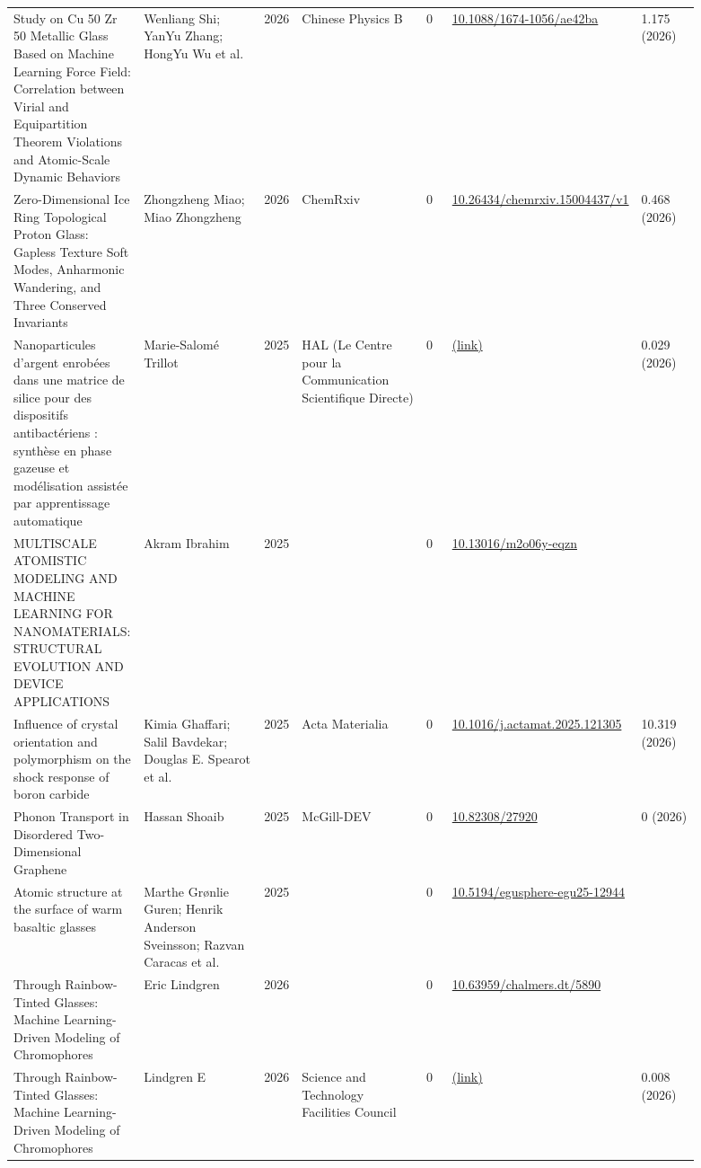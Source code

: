\documentclass[10pt,a4paper]{article}
\begin{document}
{\begin{longtable}{p{0.192\linewidth}p{0.192\linewidth}p{0.043\linewidth}p{0.192\linewidth}p{0.043\linewidth}p{0.132\linewidth}p{0.096\linewidth}}
Study on Cu 50 Zr 50 Metallic Glass Based on Machine Learning Force Field: Correlation between Virial and Equipartition Theorem Violations and Atomic-Scale Dynamic Behaviors & Wenliang Shi; YanYu Zhang; HongYu Wu et al. & 2026 & Chinese Physics B & 0 & \href{https://doi.org/10.1088/1674-1056/ae42ba}{10.1088/1674-1056/ae42ba} & 1.175 (2026) \\
Zero-Dimensional Ice Ring Topological Proton Glass: Gapless Texture Soft Modes, Anharmonic Wandering, and Three Conserved Invariants & Zhongzheng Miao; Miao Zhongzheng & 2026 & ChemRxiv & 0 & \href{https://doi.org/10.26434/chemrxiv.15004437/v1}{10.26434/chemrxiv.15004437/v1} & 0.468 (2026) \\
Nanoparticules d'argent enrobées dans une matrice de silice pour des dispositifs antibactériens : synthèse en phase gazeuse et modélisation assistée par apprentissage automatique & Marie-Salomé Trillot & 2025 & HAL (Le Centre pour la Communication Scientifique Directe) & 0 & \href{https://openalex.org/W7153401716}{(link)} & 0.029 (2026) \\
MULTISCALE ATOMISTIC MODELING AND MACHINE LEARNING FOR NANOMATERIALS: STRUCTURAL EVOLUTION AND DEVICE APPLICATIONS & Akram Ibrahim & 2025 &  & 0 & \href{https://doi.org/10.13016/m2o06y-eqzn}{10.13016/m2o06y-eqzn} &  \\
Influence of crystal orientation and polymorphism on the shock response of boron carbide & Kimia Ghaffari; Salil Bavdekar; Douglas E. Spearot et al. & 2025 & Acta Materialia & 0 & \href{https://doi.org/10.1016/j.actamat.2025.121305}{10.1016/j.actamat.2025.121305} & 10.319 (2026) \\
Phonon Transport in Disordered Two-Dimensional Graphene & Hassan Shoaib & 2025 & McGill-DEV & 0 & \href{https://doi.org/10.82308/27920}{10.82308/27920} & 0 (2026) \\
Atomic structure at the surface of warm basaltic glasses & Marthe Grønlie Guren; Henrik Anderson Sveinsson; Razvan Caracas et al. & 2025 &  & 0 & \href{https://doi.org/10.5194/egusphere-egu25-12944}{10.5194/egusphere-egu25-12944} &  \\
Through Rainbow-Tinted Glasses: Machine Learning-Driven Modeling of Chromophores & Eric Lindgren & 2026 &  & 0 & \href{https://doi.org/10.63959/chalmers.dt/5890}{10.63959/chalmers.dt/5890} &  \\
Through Rainbow-Tinted Glasses: Machine Learning-Driven Modeling of Chromophores & Lindgren E & 2026 & Science and Technology Facilities Council & 0 & \href{https://openalex.org/W7201929982}{(link)} & 0.008 (2026) \\

\end{longtable}}
\end{document}

